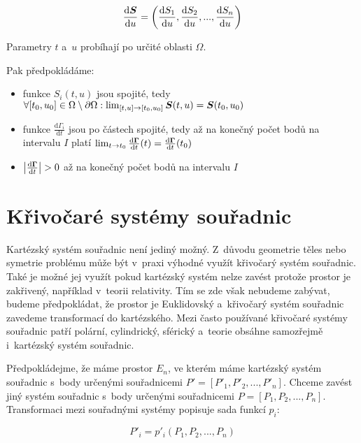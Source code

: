\begin{equation}
\frac{\mathrm{d}\boldsymbol{S}}{\mathrm{d}u} = \left(\frac{\mathrm{d}S_1}{\mathrm{d}u}, \frac{\mathrm{d}S_2}{\mathrm{d}u}, ..., \frac{\mathrm{d}S_n}{\mathrm{d}u} \right)
\end{equation}

Parametry \(t\) a~\(u\) probíhají po určité oblasti \(\Omega\).

Pak předpokládáme:

\begin{itemize}
\item funkce \(S_i(t, u)\) jsou spojité, tedy \(\forall [t_0, u_0] \in \Omega \setminus \partial \Omega: \lim_{[t, u] \to [t_0, u_0]} \boldsymbol{S}(t, u) = \boldsymbol{S}(t_0, u_0)\)
\item funkce \(\frac{\mathrm{d}\Gamma_i}{\mathrm{d}t}\) jsou po částech spojité, tedy až na konečný počet bodů na intervalu \(I\) platí \(\lim_{t \to t_0} \frac{\mathrm{d}\boldsymbol{\Gamma}}{\mathrm{d}t}(t) = \frac{\mathrm{d}\boldsymbol{\Gamma}}{\mathrm{d}t}(t_0)\)
\item \(\left|\frac{\mathrm{d}\boldsymbol{\Gamma}}{\mathrm{d}t} \right| > 0\) až na konečný počet bodů na intervalu \(I\)
\end{itemize}



\section{Křivočaré systémy souřadnic}

Kartézský systém souřadnic není jediný možný. Z~důvodu geometrie těles nebo symetrie problému může být v~praxi výhodné využít křivočarý systém souřadnic. Také je možné jej využít pokud kartézský systém nelze zavést protože prostor je zakřivený, například v~teorii relativity. Tím se zde však nebudeme zabývat, budeme předpokládat, že prostor je Euklidovský a~křivočarý systém souřadnic zavedeme transformací do kartézského. Mezi často používané křivočaré systémy souřadnic patří polární, cylindrický, sférický a~teorie obsáhne samozřejmě i~kartézský systém souřadnic.

Předpokládejme, že máme prostor \(E_n\), ve kterém máme kartézský systém souřadnic s~body určenými souřadnicemi \(P' = [P'_1, P'_2, ..., P'_n]\). Chceme zavést jiný systém souřadnic s~body určenými souřadnicemi \(P = [P_1, P_2, ..., P_n]\). Transformaci mezi souřadnými systémy popisuje sada funkcí \(p_i\):

\begin{equation}
P'_i = p'_i(P_1, P_2, ..., P_n)
\end{equation}

